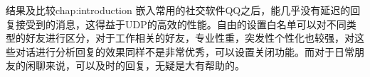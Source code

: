 \begin{cuzchapter}{结果及比较}{chap:introduction}
嵌入常用的社交软件QQ之后，能几乎没有延迟的回复接受到的消息，这得益于UDP的高效的性能。自由的设置白名单可以对不同类型的好友进行区分，对于工作相关的好友，专业性重，突发性个性化也较强，对这些对话进行分析回复的效果同样不是非常优秀，可以设置关闭功能。而对于日常朋友的闲聊来说，可以及时的回复，无疑是大有帮助的。
\end{cuzchapter}
